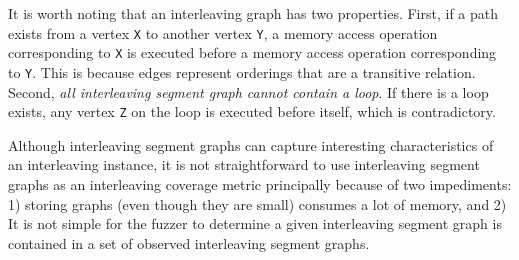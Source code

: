 It is worth noting that an interleaving graph has two
properties. First, if a path exists from a vertex \texttt{X} to
another vertex \texttt{Y}, a memory access operation corresponding to
\texttt{X} is executed before a memory access operation corresponding
to \texttt{Y}.
%
\dr{}
This is because edges represent orderings that are a transitive
relation.
%
Second, \textit{all interleaving segment graph cannot contain a loop}.
%
If there is a loop exists, any vertex \texttt{Z} on the loop is
executed before itself, which is contradictory.


%



%
Although interleaving segment graphs can capture interesting
characteristics of an interleaving instance, it is not straightforward
to use interleaving segment graphs as an interleaving coverage metric
principally because of two impediments: 1) storing graphs (even though
they are small) consumes a lot of memory, and 2) It is not simple for
the fuzzer to determine a given interleaving segment graph is
contained in a set of observed interleaving segment graphs.



